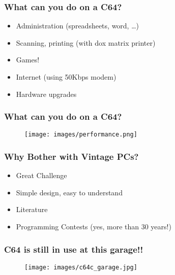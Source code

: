 \documentclass[aspectratio=43]{uva-inf-presentation}
\begin{document}

\begin{frame}
\frametitle{What can you do on a C64?}

\begin{itemize}
\item Administration (spreadsheets, word, \dots)
\item Scanning, printing (with dox matrix printer)
\item Games!
\item Internet (using 50Kbps modem)
\item Hardware upgrades
\end{itemize}

\end{frame}


\begin{frame}
\frametitle{What can you do on a C64?}

\begin{figure}
\texttt{[image: images/performance.png]}
\end{figure}

\end{frame}


\begin{frame}
\frametitle{Why Bother with Vintage PCs?}

\begin{itemize}
\item Great Challenge
\item Simple design, easy to understand
\item Literature
\item Programming Contests (yes, more than 30 years!)
\end{itemize}

\end{frame}


\begin{frame}
\frametitle{C64 is still in use at this garage!!}

\begin{figure}
\texttt{[image: images/c64c\_garage.jpg]}
\end{figure}

\end{frame}
\end{document}
